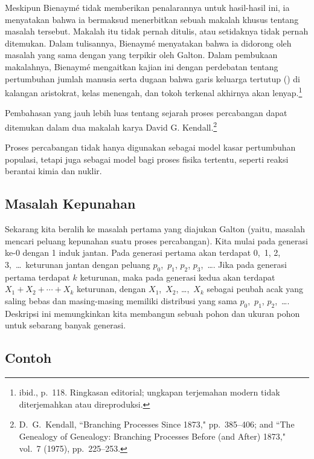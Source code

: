 Meskipun Bienaym\'e tidak memberikan penalarannya untuk hasil-hasil ini, ia
menyatakan bahwa ia bermaksud menerbitkan sebuah makalah khusus tentang masalah tersebut.  Makalah itu
tidak pernah ditulis, atau setidaknya tidak pernah ditemukan.  Dalam tulisannya,
Bienaym\'e menyatakan bahwa ia didorong oleh masalah yang sama dengan yang terpikir oleh
Galton.  Dalam pembukaan makalahnya, Bienaym\'e mengaitkan kajian ini dengan perdebatan
tentang pertumbuhan jumlah manusia serta dugaan bahwa garis keluarga tertutup
() di kalangan aristokrat, kelas menengah, dan tokoh terkenal akhirnya
akan lenyap.\footnote{ibid., p.~118. Ringkasan editorial; ungkapan terjemahan modern tidak
diterjemahkan atau direproduksi.}


Pembahasan yang jauh lebih luas tentang sejarah proses percabangan dapat
ditemukan dalam dua makalah karya David G. Kendall.\footnote{D.~G.~Kendall, 
``Branching Processes Since 1873," pp.~385--406; and ``The Genealogy of Genealogy:
Branching Processes Before (and After) 1873,"  vol.~7 (1975), pp.~225--253.} 

Proses percabangan tidak hanya digunakan sebagai model kasar pertumbuhan populasi,
tetapi juga sebagai model bagi proses fisika tertentu, seperti reaksi berantai
kimia dan nuklir.

\subsection*{Masalah Kepunahan}
Sekarang kita beralih ke masalah pertama yang diajukan Galton (yaitu, masalah mencari
peluang kepunahan suatu proses percabangan).  Kita mulai pada
generasi ke-0 dengan 1 induk jantan.  Pada generasi pertama akan terdapat 0,~1,
2, 3,~\ldots\ keturunan jantan dengan peluang $p_0$,~$p_1$, $p_2$,
$p_3$,~\ldots.  Jika pada generasi pertama terdapat $k$ keturunan, maka pada
generasi kedua akan terdapat $X_1 + X_2 +\cdots+ X_k$ keturunan, dengan
$X_1$,~$X_2$, \ldots,~$X_k$ sebagai peubah acak yang saling bebas dan masing-masing memiliki
distribusi yang sama $p_0$,~$p_1$, $p_2$,~\ldots.  Deskripsi ini memungkinkan kita
membangun sebuah pohon dan ukuran pohon untuk sebarang banyak generasi.

\subsection*{Contoh}

